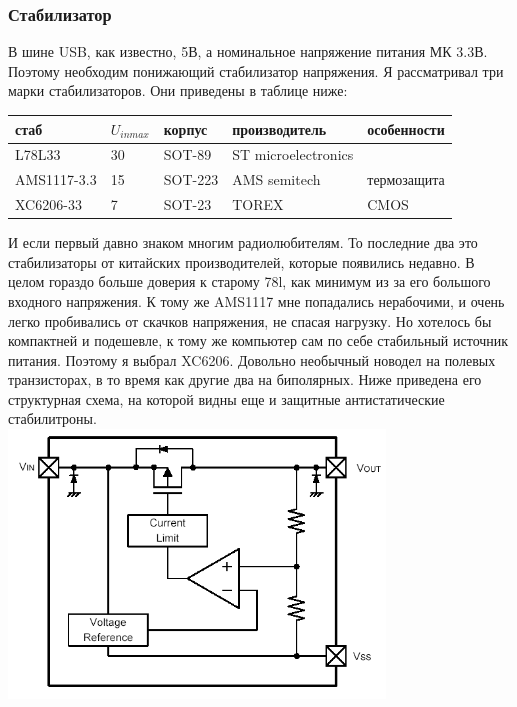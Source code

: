 \documentclass[12pt,a4paper]{article}
\begin{document}
\subsubsection{Стабилизатор}
    В шине USB, как известно, 5В, а номинальное напряжение питания МК 3.3В.
    Поэтому необходим понижающий стабилизатор напряжения. Я рассматривал три
    марки стабилизаторов. Они приведены в таблице ниже:
\begin{center}
  \begin{tabular}{ | l | l | l | l | l | }
    \hline
    стаб & $U_{in max}$ & корпус & производитель & особенности \\ \hline
    L78L33 & 30 & SOT-89 & ST microelectronics &  \\ \hline
    AMS1117-3.3 & 15 & SOT-223 & AMS semitech & термозащита \\ \hline
    XC6206-33 & 7 & SOT-23 & TOREX & CMOS \\ \hline
     \end{tabular}
\end{center}
    И если первый давно знаком многим радиолюбителям. То последние два это
    стабилизаторы от китайских производителей, которые появились недавно.
    В целом гораздо больше доверия к старому 78l, как минимум из за его
    большого входного напряжения. К тому же AMS1117 мне
    попадались нерабочими, и очень легко пробивались от скачков напряжения,
    не спасая нагрузку. Но хотелось бы компактней и подешевле, к тому же
    компьютер сам по себе стабильный источник питания. Поэтому я выбрал XC6206.
    Довольно необычный новодел на полевых транзисторах, в то время как другие
    два на биполярных. Ниже приведена его структурная схема, на которой видны
    еще и защитные антистатические стабилитроны.\\
\includegraphics[width=10cm]{6206.png}
\end{document}
